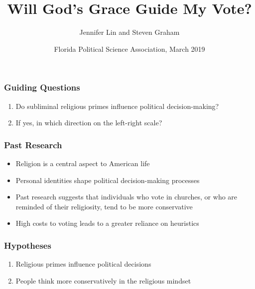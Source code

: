 \documentclass[14pt]{beamer}
\begin{document}
\author[Lin, J., and Graham, S.] %
{Jennifer Lin and Steven Graham}
	\title{Will God’s Grace Guide My Vote?}
		
	\date[FPSA 2019]{Florida Political Science Association, March 2019}
	\begin{frame}[plain]
	\maketitle
\end{frame}

\begin{frame}
\frametitle{Guiding Questions}
\begin{enumerate}
	\item Do subliminal religious primes influence political decision-making?
	\item If yes, in which direction on the left-right scale?
\end{enumerate}
\end{frame}

\begin{frame}
\frametitle{Past Research}
\begin{itemize}
	\item Religion is a central aspect to American life
	\item Personal identities shape political decision-making processes
	\item Past research suggests that individuals who vote in churches, or who are reminded of their religiosity, tend to be more conservative
	\item High costs to voting leads to a greater reliance on heuristics
\end{itemize}
\end{frame}

\begin{frame}
\frametitle{Hypotheses}
\begin{enumerate}
	\item Religious primes influence political decisions
	\item People think more conservatively in the religious mindset
\end{enumerate}
\end{frame}
\end{document}
